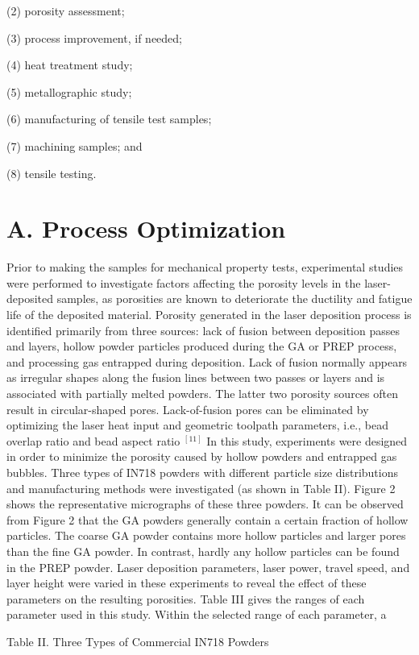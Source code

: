 \documentclass[10pt]{article}
\begin{document}
(2) porosity assessment;

(3) process improvement, if needed;

(4) heat treatment study;

(5) metallographic study;

(6) manufacturing of tensile test samples;

(7) machining samples; and

(8) tensile testing.

\section*{A. Process Optimization}
Prior to making the samples for mechanical property tests, experimental studies were performed to investigate factors affecting the porosity levels in the laser-deposited samples, as porosities are known to deteriorate the ductility and fatigue life of the deposited material. Porosity generated in the laser deposition process is identified primarily from three sources: lack of fusion between deposition passes and layers, hollow powder particles produced during the GA or PREP process, and processing gas entrapped during deposition. Lack of fusion normally appears as irregular shapes along the fusion lines between two passes or layers and is associated with partially melted powders. The latter two porosity sources often result in circular-shaped pores. Lack-of-fusion pores can be eliminated by optimizing the laser heat input and geometric toolpath parameters, i.e., bead overlap ratio and bead aspect ratio ${ }^{[11]}$ In this study, experiments were designed in order to minimize the porosity caused by hollow powders and entrapped gas bubbles. Three types of IN718 powders with different particle size distributions and manufacturing methods were investigated (as shown in Table II). Figure 2 shows the representative micrographs of these three powders. It can be observed from Figure 2 that the GA powders generally contain a certain fraction of hollow particles. The coarse GA powder contains more hollow particles and larger pores than the fine GA powder. In contrast, hardly any hollow particles can be found in the PREP powder. Laser deposition parameters, laser power, travel speed, and layer height were varied in these experiments to reveal the effect of these parameters on the resulting porosities. Table III gives the ranges of each parameter used in this study. Within the selected range of each parameter, a

Table II. Three Types of Commercial IN718 Powders
\end{document}
